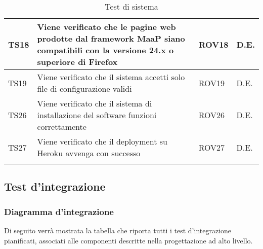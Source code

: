 \begin{center}
\begin{longtable}{|p{2cm}|p{7cm}|p{2cm}|p{2cm}|}
\midrule
TS18 & Viene verificato che le pagine web prodotte dal framework MaaP siano compatibili con la versione 24.x o superiore di Firefox & ROV18 & D.E.\\
\midrule
TS19 & Viene verificato che il sistema accetti solo file di configurazione validi & ROV19 & D.E.\\
\midrule
TS26 & Viene verificato che il sistema di installazione del software funzioni correttamente & ROV26 & D.E.\\
\midrule
TS27 & Viene verificato che il deployment su Heroku avvenga con successo & ROV27 & D.E.\\
\bottomrule
\caption{Test di sistema}
\label{tab:changelog}
\end{longtable}
\end{center}
\subsection{Test d'integrazione}

\subsubsection{Diagramma d'integrazione}

Di seguito verrà mostrata la tabella che riporta tutti i test d'integrazione pianificati, associati alle componenti descritte nella progettazione ad alto livello.\\
